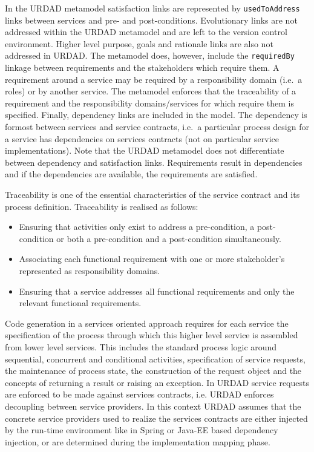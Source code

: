 In the URDAD metamodel satisfaction links are represented by \verb+usedToAddress+ links between services and pre- and post-conditions. Evolutionary links are not addressed within the URDAD metamodel and are left to the version control environment. Higher level purpose, goals and rationale links are also not addressed in URDAD. The metamodel does, however, include the \verb+requiredBy+ linkage between requirements and the stakeholders which require them. A requirement around a service may be required by a responsibility domain (i.e.\ a roles) or by another service. The metamodel enforces that the traceability of a requirement and the responsibility domains/services for which require them is specified. Finally, dependency links are included in the model. The dependency is formost between services and service contracts, i.e.\ a particular process design for a service has dependencies on services contracts (not on particular service implementations). Note that the URDAD metamodel does not differentiate between dependency and satisfaction links. Requirements result in dependencies and if the dependencies are available, the requirements are satisfied.

					\item Traceability is one of the essential characteristics of the service contract and its process definition. Traceability is realised as follows:
						\begin{itemize}
							\item Ensuring that activities only exist to address a pre-condition, a post-condition or both a pre-condition and a post-condition simultaneously.
							\item Associating each functional requirement with one or more stakeholder's represented as responsibility domains.
							\item Ensuring that a service addresses all functional requirements and only the relevant functional requirements.
						\end{itemize}

Code generation in a services oriented approach requires for each service the specification of the process through which this higher level service is assembled from lower level services. This includes the standard process logic around sequential, concurrent and conditional activities, specification of service requests, the maintenance of process state, the construction of the request object and the concepts of returning a result or raising an exception. In URDAD service requests are enforced to be made against services contracts, i.e. URDAD enforces decoupling between service providers. In this context URDAD assumes that the concrete service providers used to realize the services contracts are either injected by the run-time environment like in Spring or Java-EE based dependency injection, or are determined during the implementation mapping phase.

